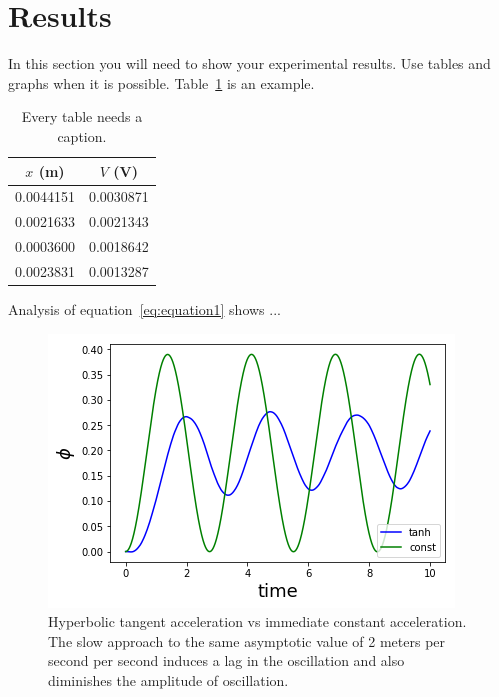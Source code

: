 \documentclass[12pt]{article}
\begin{document}
\section{Results}

In this section you will need to show your experimental results. Use tables and
graphs when it is possible. Table~\ref{tbl:bins} is an example.

\begin{table}[ht]
	\begin{center}
		\caption{Every table needs a caption.}
		\label{tbl:bins} %
		\begin{tabular}{|cc|}
			\hline
			\multicolumn{1}{|c}{$x$ (m)} & \multicolumn{1}{c|}{$V$ (V)} \\
			\hline
			0.0044151                    & 0.0030871                    \\
			0.0021633                    & 0.0021343                    \\
			0.0003600                    & 0.0018642                    \\
			0.0023831                    & 0.0013287                    \\
			\hline
		\end{tabular}
	\end{center}
\end{table}

Analysis of equation~\ref{eq:equation1} shows ...

\blindtext

\begin{figure}
	\centering
	\includegraphics[width=.7\textwidth]{tanh_vs_const_1.png}
	\caption{Hyperbolic tangent acceleration vs immediate constant acceleration. The slow approach to the same asymptotic value of 2 meters per second per second induces a lag in the oscillation and also diminishes the amplitude of oscillation.}
\end{figure}
\end{document}
